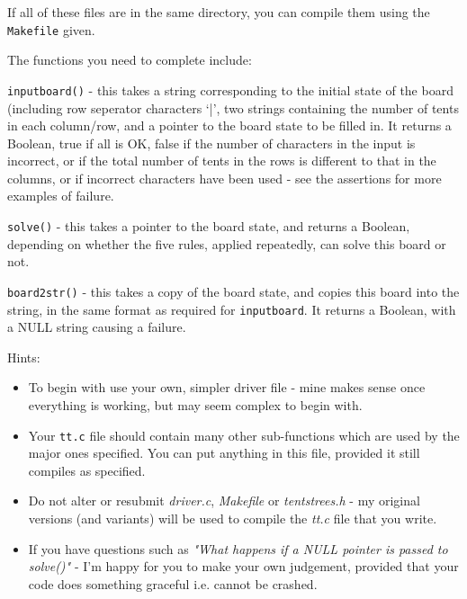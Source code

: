 \begin{exercise}
\noindent If all of these files are in the same directory, you can
compile them using the \verb^Makefile^ given.

\noindent The functions you need to complete include:

\verb^inputboard()^ - this takes a string corresponding to the initial
state of the board (including row seperator characters `|',
two strings containing the number of tents in each
column/row, and a pointer to the board state to be filled in. It returns
a Boolean, true if all is OK, false if the number of characters in the
input is incorrect, or if the total number of tents in the rows is
different to that in the columns, or if incorrect characters have been
used - see the assertions for more examples of failure.

\verb^solve()^ - this takes a pointer to the board state, and returns
a Boolean, depending on whether the five rules, applied repeatedly,
can solve this board or not.

\verb^board2str()^ - this takes a copy of the board state, and
copies this board into the string, in the same format as required for
\verb^inputboard^. It returns a Boolean, with a NULL string causing
a failure.

\noindent Hints:
\begin{itemize}

\item To begin with use your own, simpler driver file - mine makes sense
once everything is working, but may seem complex to begin with.

\item Your \verb^tt.c^ file should contain many other sub-functions
which are used by the major ones specified. You can put anything in this
file, provided it still compiles as specified.

\item Do not alter or resubmit {\em driver.c}, {\em Makefile} or
{\em tentstrees.h} - my original versions (and variants) will be
used to compile the {\em tt.c} file that you write.

\item If you have questions such as {\em "What happens if a NULL pointer is passed
to solve()"} - I'm happy for you to make your own judgement, provided that your code
does something graceful i.e. cannot be crashed.

\end{itemize}

\end{exercise}
